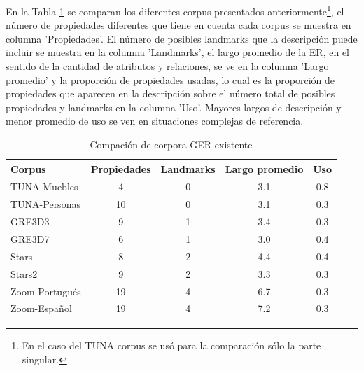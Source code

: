 En la Tabla \ref{tab-comparison} se comparan los diferentes corpus presentados anteriormente\footnote{En el caso del TUNA corpus se us\'o para la comparaci\'on s\'olo la parte singular.}, el n\'umero de propiedades diferentes que tiene en cuenta cada corpus se muestra en columna 'Propiedades'. El n\'umero de posibles landmarks que la descripci\'on puede incluir se muestra en la columna 'Landmarks', el largo promedio de la ER, en el sentido de la cantidad de atributos y relaciones, se ve en la columna 'Largo promedio' y la proporci\'on de propiedades usadas, lo cual es la proporci\'on de propiedades que aparecen en la descripci\'on sobre el n\'umero total de posibles propiedades y landmarks en la columna 'Uso'. Mayores largos de descripci\'on y menor promedio de uso se ven en situaciones complejas de referencia.

\begin{table}[ht]
\begin{center}
\footnotesize{
\caption{Compaci\'on de corpora GER existente}
\label{tab-comparison}
\begin{tabular} {  l c c c c}
\hline
Corpus											&Propiedades			  & Landmarks			& Largo promedio	& Uso \\
\hline
TUNA-Muebles							  & 4								& 0							&	3.1				& 0.8   \\
TUNA-Personas								& 10							& 0							& 3.1				& 0.3   \\
GRE3D3											&	9								& 1							& 3.4				& 0.3   \\
GRE3D7											&	6								& 1							& 3.0				& 0.4   \\
Stars												&	8								& 2							& 4.4				& 0.4   \\
Stars2											& 9								& 2							& 3.3				& 0.3   \\
Zoom-Portugu\'es						& 19							& 4							& 6.7				& 0.3   \\
Zoom-Espa\~nol							& 19							& 4							& 7.2				& 0.3   \\
\hline
\end{tabular}
}
\end{center}
\end{table}

